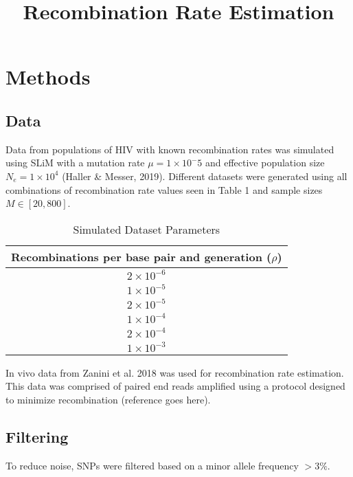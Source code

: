 \documentclass[12pt]{article}
\begin{document}
\title{Recombination Rate Estimation}
\maketitle
\section*{Methods}
\subsection*{Data}
    Data from populations of HIV with known recombination rates was simulated using SLiM with a mutation rate $\mu = 1 \times10^-5$ and effective population size $N_e = 1 \times 10^4$ (Haller \& Messer, 2019). Different datasets were generated using all combinations of recombination rate values seen in Table 1 and sample sizes $M \in [20, 800]$.
\begin{table}[htb]
\caption{Simulated Dataset Parameters}
\centering
\begin{tabular}{c}
\noalign{\smallskip} \hline \hline \noalign{\smallskip}
Recombinations per base pair and generation ($\rho$) \\
\hline
$2 \times 10^{-6}$ \\
$1 \times 10^{-5}$ \\
$2 \times 10^{-5}$ \\
$1 \times 10^{-4}$ \\
$2 \times 10^{-4}$ \\
$1 \times 10^{-3}$ \\
\end{tabular}
\centering
\end{table}

    In vivo data from Zanini et al. 2018 was used for recombination rate estimation. This data was comprised of paired end reads amplified using a protocol designed to minimize recombination (reference goes here). 

\subsection*{Filtering}

     To reduce noise, SNPs were filtered based on a minor allele frequency $>3\%$. 
\end{document}
